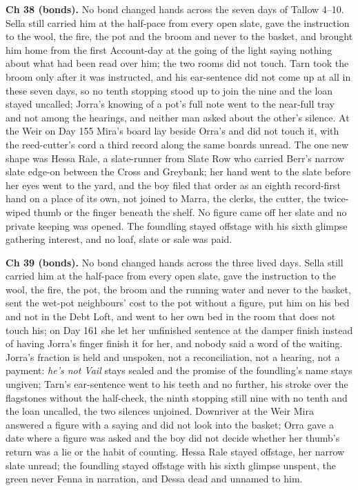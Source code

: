\documentclass{design/chronicle}
\begin{document}
{\textbf{Ch 38 (bonds).} No bond changed hands across the seven days of Tallow 4–10. Sella still carried him at the half-pace from every open slate, gave the instruction to the wool, the fire, the pot and the broom and never to the basket, and brought him home from the first Account-day at the going of the light saying nothing about what had been read over him; the two rooms did not touch. Tarn took the broom only after it was instructed, and his ear-sentence did not come up at all in these seven days, so no tenth stopping stood up to join the nine and the loan stayed uncalled; Jorra’s knowing of a pot’s full note went to the near-full tray and not among the hearings, and neither man asked about the other’s silence. At the Weir on Day 155 Mira’s board lay beside Orra’s and did not touch it, with the reed-cutter’s cord a third record along the same boards unread. The one new shape was Hessa Rale, a slate-runner from Slate Row who carried Berr’s narrow slate edge-on between the Cross and Greybank; her hand went to the slate before her eyes went to the yard, and the boy filed that order as an eighth record-first hand on a place of its own, not joined to Marra, the clerks, the cutter, the twice-wiped thumb or the finger beneath the shelf. No figure came off her slate and no private keeping was opened. The foundling stayed offstage with his sixth glimpse gathering interest, and no loaf, slate or sale was paid.

\textbf{Ch 39 (bonds).} No bond changed hands across the three lived days. Sella still carried him at the half-pace from every open slate, gave the instruction to the wool, the fire, the pot, the broom and the running water and never to the basket, sent the wet-pot neighbours’ cost to the pot without a figure, put him on his bed and not in the Debt Loft, and went to her own bed in the room that does not touch his; on Day 161 she let her unfinished sentence at the damper finish instead of having Jorra’s finger finish it for her, and nobody said a word of the waiting. Jorra’s fraction is held and unspoken, not a reconciliation, not a hearing, not a payment: \emph{he’s not Vail} stays sealed and the promise of the foundling’s name stays ungiven; Tarn’s ear-sentence went to his teeth and no further, his stroke over the flagstones without the half-check, the ninth stopping still nine with no tenth and the loan uncalled, the two silences unjoined. Downriver at the Weir Mira answered a figure with a saying and did not look into the basket; Orra gave a date where a figure was asked and the boy did not decide whether her thumb’s return was a lie or the habit of counting. Hessa Rale stayed offstage, her narrow slate unread; the foundling stayed offstage with his sixth glimpse unspent, the green never Fenna in narration, and Dessa dead and unnamed to him.

}
\end{document}
